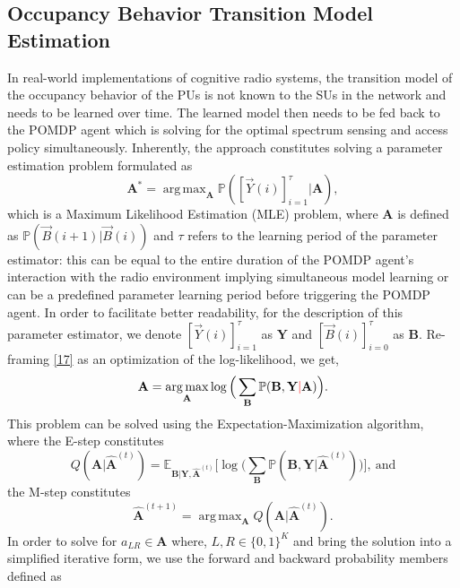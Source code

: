 \documentclass[10pt,twocolumn]{IEEEtran}
\DeclareMathOperator*{\argmax}{arg\,max}
\newcommand{\add}[1]{{\color{red}{#1}}}
\begin{document}
\subsection{Occupancy Behavior Transition Model Estimation}
In real-world implementations of cognitive radio systems, the transition model of the occupancy behavior of the PUs is not known to the SUs in the network and needs to be learned over time. The learned model then needs to be fed back to the POMDP agent which is solving for the optimal spectrum sensing and access policy simultaneously. Inherently, the approach constitutes solving a parameter estimation problem formulated as
\begin{equation}\label{17}
    \mathbf{A}^{*} = \argmax_{\mathbf{A}} \mathbb{P}([\vec{Y}(i)]_{i=1}^{\tau}|\mathbf{A}),
\end{equation}
which is a Maximum Likelihood Estimation (MLE) problem, where $\mathbf{A}$ is defined as $\mathbb{P}(\vec{B}(i+1)|\vec{B}(i))$ and $\tau$ refers to the learning period of the parameter estimator: this can be equal to the entire duration of the POMDP agent's interaction with the radio environment implying simultaneous model learning or can be a predefined parameter learning period before triggering the POMDP agent. In order to facilitate better readability, for the description of this parameter estimator, we denote $[\vec{Y}(i)]_{i=1}^{\tau}$ as $\mathbf{Y}$ and $[\vec{B}(i)]_{i=0}^{\tau}$ as $\mathbf{B}$. Re-framing \eqref{17} as an optimization of the log-likelihood, we get,
\begin{equation}\label{18}
    \mathbf{A} = \argmax_{\mathbf{A}} \log\Big(\sum_{\mathbf{B}} \mathbb{P}(\mathbf{B}, \mathbf{Y}\add{|} \mathbf{A})\Big).
\end{equation}
This problem can be solved using the Expectation-Maximization algorithm, where the E-step constitutes
\begin{equation}
    Q(\mathbf{A}|\hat{\mathbf{A}}^{(t)}) = \mathbb{E}_{\mathbf{B}|\mathbf{Y}, \hat{\mathbf{A}}^{(t)}} \Big[ \log \Big(\sum_{\mathbf{B}} \mathbb{P}(\mathbf{B}, \mathbf{Y}|\hat{\mathbf{A}}^{(t)}) \Big) \Big],\ \text{and}
\end{equation}
the M-step constitutes
\begin{equation}
    \hat{\mathbf{A}}^{(t+1)} = \argmax_{\mathbf{A}} Q(\mathbf{A}|\hat{\mathbf{A}}^{(t)}).
\end{equation}
In order to solve for $a_{LR} \in \mathbf{A}$ where, $L, R \in \{0, 1\}^{K}$ and bring the solution into a simplified iterative form, we use the forward and backward probability members defined as
\end{document}
